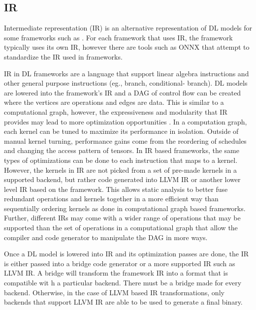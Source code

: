 



\subsection{IR}
Intermediate representation (IR) is an alternative representation of DL models
for some frameworks such as \cite{DLVM} \cite{nGraph} \cite{ONNX}. For each
framework that uses IR, the framework typically uses its own IR, however
there are tools such as ONNX that attempt to standardize the IR used in
frameworks. 

IR in DL frameworks are a language that support linear algebra instructions and
other general purpose instructions (eg., branch, conditional- branch). DL
models are lowered into the framework's IR and a DAG of control flow
\cite{nGraph} can be created where the vertices are operations and edges are
data. This is similar to a computational graph, however, the expressiveness and
modularity that IR provides may lead to more optimization opportunities
\cite{DLVM}. In a computation graph, each kernel can be tuned to maximize its
performance in isolation. Outside of manual kernel turning, performance gains
come from the reordering of schedules and changing the access pattern of
tensors.  In IR based frameworks, the same types of optimizations can be done
to each instruction that maps to a kernel. However, the kernels in IR are not
picked from a set of pre-made kernels in a supported backend, but rather code
generated into LLVM IR or another lower level IR based on the framework. This
allows static analysis to better fuse redundant operations and kernels together
in a more efficient way than sequentially ordering kernels as done in
computational graph based frameworks. Further, different IRs may come with
a wider range of operations that may be supported than the set of operations in
a computational graph that allow the compiler and code generator to manipulate
the DAG in more ways.

Once a DL model is lowered into IR and its optimization passes are done, the IR
is either passed into a bridge code generator or a more supported IR such as
LLVM IR. A bridge will transform the framework IR into a format that is
compatible wit h a particular backend. There must be a bridge made for every
backend. Otherwise, in the case of LLVM based IR transformations, only
backends that support LLVM IR are able to be used to generate a final binary.

